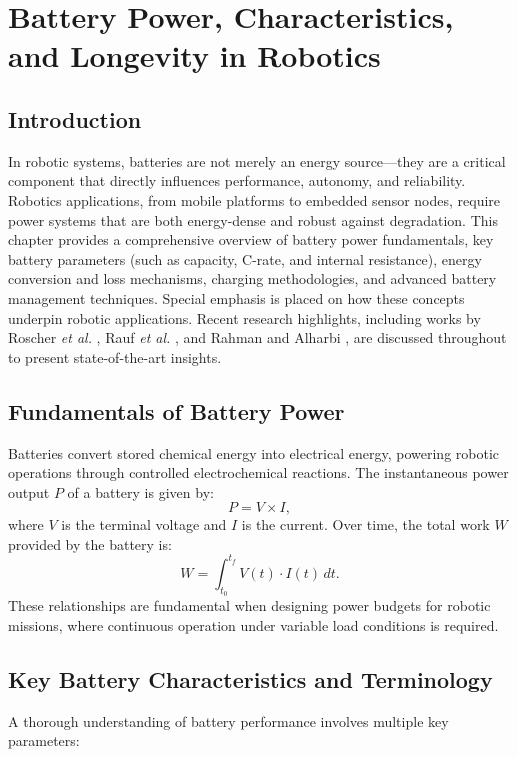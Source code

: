 \chapter{Battery Power, Characteristics, and Longevity in Robotics}
\label{chap:battery}

\section{Introduction}
In robotic systems, batteries are not merely an energy source---they are a critical component that directly influences performance, autonomy, and reliability. Robotics applications, from mobile platforms to embedded sensor nodes, require power systems that are both energy-dense and robust against degradation. This chapter provides a comprehensive overview of battery power fundamentals, key battery parameters (such as capacity, C-rate, and internal resistance), energy conversion and loss mechanisms, charging methodologies, and advanced battery management techniques. Special emphasis is placed on how these concepts underpin robotic applications. Recent research highlights, including works by Roscher \emph{et al.} \cite{Roscher2011}, Rauf \emph{et al.} \cite{Rauf2022}, and Rahman and Alharbi \cite{Rahman2024}, are discussed throughout to present state-of-the-art insights.

\section{Fundamentals of Battery Power}
Batteries convert stored chemical energy into electrical energy, powering robotic operations through controlled electrochemical reactions. The instantaneous power output \(P\) of a battery is given by:
\begin{equation}
P = V \times I,
\end{equation}
where \(V\) is the terminal voltage and \(I\) is the current. Over time, the total work \(W\) provided by the battery is:
\begin{equation}
W = \int_{t_0}^{t_f} V(t) \cdot I(t) \, dt.
\end{equation}
These relationships are fundamental when designing power budgets for robotic missions, where continuous operation under variable load conditions is required.

\section{Key Battery Characteristics and Terminology}
A thorough understanding of battery performance involves multiple key parameters:

